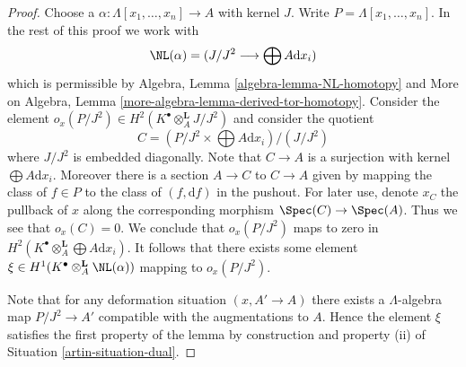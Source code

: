 \begin{proof}

Choose a $\alpha : \Lambda[x_1, \ldots, x_n] \to A$ with kernel $J$.
Write $P = \Lambda[x_1, \ldots, x_n]$. In the rest of this proof we work with
$$
\NL(\alpha) = (J/J^2 \longrightarrow \bigoplus A \text{d}x_i)
$$
which is permissible by
Algebra, Lemma \ref{algebra-lemma-NL-homotopy}
and
More on Algebra, Lemma \ref{more-algebra-lemma-derived-tor-homotopy}.
Consider the element
$o_x(P/J^2) \in H^2(K^\bullet \otimes_A^\mathbf{L} J/J^2)$ and consider
the quotient
$$
C = (P/J^2 \times \bigoplus A \text{d}x_i)/(J/J^2)
$$
where $J/J^2$ is embedded diagonally. Note that $C \to A$ is a surjection
with kernel $\bigoplus A\text{d}x_i$. Moreover there is a section
$A \to C$ to $C \to A$ given by mapping the class of $f \in P$ to the class
of $(f, \text{d}f)$ in the pushout. For later use, denote $x_C$ the
pullback of $x$ along the corresponding morphism $\Spec(C) \to \Spec(A)$.
Thus we see that $o_x(C) = 0$.
We conclude that $o_x(P/J^2)$ maps to zero in
$H^2(K^\bullet \otimes_A^\mathbf{L} \bigoplus A\text{d}x_i)$.
It follows that there exists some element
$\xi \in H^1(K^\bullet \otimes_A^\mathbf{L} \NL(\alpha))$
mapping to $o_x(P/J^2)$.

\medskip\noindent
Note that for any deformation situation $(x, A' \to A)$ there exists
a $\Lambda$-algebra map $P/J^2 \to A'$ compatible with the augmentations
to $A$. Hence the
element $\xi$ satisfies the first property of the lemma by construction
and property (ii) of Situation \ref{artin-situation-dual}.


\end{proof}
